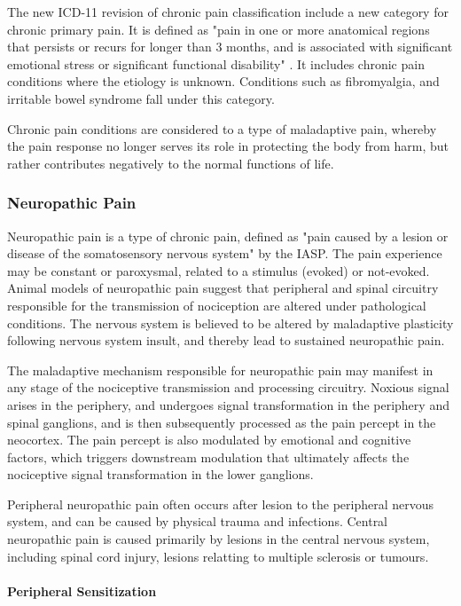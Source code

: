 The new ICD-11 revision of chronic pain classification include a new category for chronic primary pain. It is defined as "pain in one or more anatomical regions that persists or recurs for longer than 3 months, and is associated with significant emotional stress or significant functional disability" \cite{Treede2015}. It includes chronic pain conditions where the etiology is unknown. Conditions such as fibromyalgia, and irritable bowel syndrome fall under this category.

Chronic pain conditions are considered to a type of maladaptive pain, whereby the pain response no longer serves its role in protecting the body from harm, but rather contributes negatively to the normal functions of life. 


\subsubsection{Neuropathic Pain}

Neuropathic pain is a type of chronic pain, defined as "pain caused by a lesion or disease of the somatosensory nervous system" by the IASP. The pain experience may be constant or paroxysmal, related to a stimulus (evoked) or not-evoked. Animal models of neuropathic pain suggest that peripheral and spinal circuitry responsible for the transmission of nociception are altered under pathological conditions. The nervous system is believed to be altered by maladaptive plasticity following nervous system insult, and thereby lead to sustained neuropathic pain.

The maladaptive mechanism responsible for neuropathic pain may manifest in any stage of the nociceptive transmission and processing circuitry. 
Noxious signal arises in the periphery, and undergoes signal transformation in the periphery and spinal ganglions, and is then subsequently processed as the pain percept in the neocortex. The pain percept is also modulated by emotional and cognitive factors, which triggers downstream modulation that ultimately affects the nociceptive signal transformation in the lower ganglions. 

Peripheral neuropathic pain often occurs after lesion to the peripheral nervous system, and can be caused by physical trauma and infections. Central neuropathic pain is caused primarily by lesions in the central nervous system, including spinal cord injury, lesions relatting to multiple sclerosis or tumours. 


\paragraph{Peripheral Sensitization}

